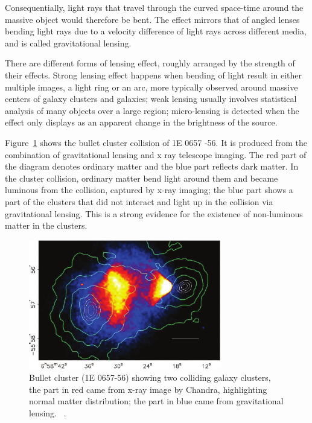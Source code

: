 	Consequentially, light rays that travel through the curved space-time around the massive object would therefore be bent. The effect mirrors that of angled lenses bending light rays due to a velocity difference of light rays across different media, and is called gravitational lensing. 

	There are different forms of lensing effect, roughly arranged by the strength of their effects. Strong lensing effect happens when bending of light result in either multiple images, a light ring or an arc, more typically observed around massive centers of galaxy clusters and galaxies; weak lensing usually involves statistical analysis of many objects over a large region; micro-lensing is detected when the effect only displays as an apparent change in the brightness of the source.

    Figure~\ref{fig:BulletCluster_figure} shows the bullet cluster collision of 1E 0657 -56. It is produced from the combination of gravitational lensing and x ray telescope imaging. The red part of the diagram denotes ordinary matter and the blue part reflects dark matter. In the cluster collision, ordinary matter bend light around them and became luminous from the collision, captured by x-ray imaging; the blue part shows a part of the clusters that did not interact and light up in the collision via gravitational lensing. This is a strong evidence for the existence of non-luminous matter in the clusters.

\begin{figure}[!htb]
    \begin{center}
        \includegraphics[width=0.75\textwidth]{figures/chapter_DM/BulletCluster}
        \caption{
			Bullet cluster (1E 0657-56) showing two colliding galaxy clusters, the part in red came from x-ray image by Chandra, highlighting normal matter distribution; the part in blue came from gravitational lensing. ~\cite{BulletCluster}.
        }
        \label{fig:BulletCluster_figure}
    \end{center}
\end{figure}


